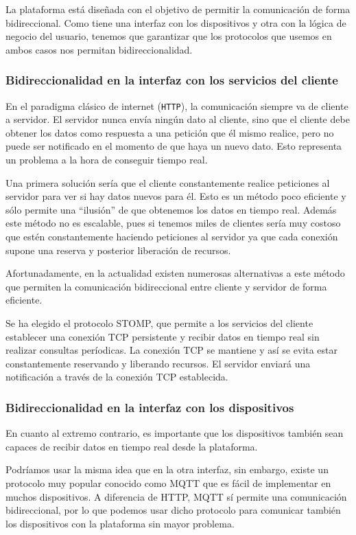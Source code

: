 La plataforma está diseñada con el objetivo de permitir la comunicación de forma
bidireccional. Como tiene una interfaz con los dispositivos y otra con la lógica
de negocio del usuario, tenemos que garantizar que los protocolos que usemos en
ambos casos nos permitan bidireccionalidad.

\subsubsection{Bidireccionalidad en la interfaz con los servicios del cliente}

En el paradigma clásico de internet (\texttt{HTTP}), la comunicación siempre va de
cliente a servidor. El servidor nunca envía ningún dato al cliente, sino que el
cliente debe obtener los datos como respuesta a una petición que él mismo
realice, pero no puede ser notificado en el momento de que haya un nuevo dato.
Esto representa un problema a la hora de conseguir tiempo real.

Una primera solución sería que el cliente constantemente realice peticiones al
servidor para ver si hay datos nuevos para él. Esto es un método poco eficiente
y sólo permite una ``ilusión'' de que obtenemos los datos en tiempo real. Además
este método no es escalable, pues si tenemos miles de clientes sería muy costoso
que estén constantemente haciendo peticiones al servidor ya que cada conexión
supone una reserva y posterior liberación de recursos.

Afortunadamente, en la actualidad existen numerosas alternativas a este método
que permiten la comunicación bidireccional entre cliente y servidor de forma
eficiente.

Se ha elegido el protocolo STOMP, que
permite a los servicios del cliente establecer una conexión TCP persistente y
recibir datos en tiempo real sin realizar consultas períodicas. La conexión TCP
se mantiene y así se evita estar constantemente reservando y liberando recursos.
El servidor enviará una notificación a través de la conexión TCP establecida.

\subsubsection{Bidireccionalidad en la interfaz con los dispositivos}

En cuanto al extremo contrario, es importante que los dispositivos también sean
capaces de recibir datos en tiempo real desde la plataforma.

Podríamos usar la misma idea que en la otra interfaz, sin embargo, existe un
protocolo muy popular conocido como MQTT que es fácil de implementar en muchos
dispositivos. A diferencia de HTTP, MQTT sí permite una comunicación
bidireccional, por lo que podemos usar dicho protocolo para comunicar también
los dispositivos con la plataforma sin mayor problema.

